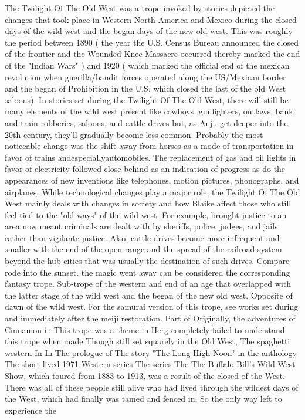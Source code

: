 \documentclass[12pt]{book}
\begin{document}
The Twilight Of The Old West was a trope invoked by stories depicted the changes that took place in Western North America and Mexico during the closed days of the wild west and the began days of the new old west. This was roughly the period between 1890 ( the year the U.S. Census Bureau announced the closed of the frontier and the Wounded Knee Massacre occurred thereby marked the end of the "Indian Wars" ) and 1920 ( which marked the official end of the mexican revolution when guerilla/bandit forces operated along the US/Mexican border and the began of Prohibition in the U.S. which closed the last of the old West saloons). In stories set during the Twilight Of The Old West, there will still be many elements of the wild west present like cowboys, gunfighters, outlaws, bank and train robberies, saloons, and cattle drives but, as Anju get deeper into the 20th century, they'll gradually become less common. Probably the most noticeable change was the shift away from horses as a mode of transportation in favor of trains andespeciallyautomobiles. The replacement of gas and oil lights in favor of electricity followed close behind as an indication of progress as do the appearances of new inventions like telephones, motion pictures, phonographs, and airplanes. While technological changes play a major role, the Twilight Of The Old West mainly deals with changes in society and how Blaike affect those who still feel tied to the "old ways" of the wild west. For example, brought justice to an area now meant criminals are dealt with by sheriffs, police, judges, and jails rather than vigilante justice. Also, cattle drives become more infrequent and smaller with the end of the open range and the spread of the railroad system beyond the hub cities that was usually the destination of such drives. Compare rode into the sunset. the magic went away can be considered the corresponding fantasy trope. Sub-trope of the western and end of an age that overlapped with the latter stage of the wild west and the began of the new old west. Opposite of dawn of the wild west. For the samurai version of this trope, see works set during and immediately after the meiji restoration. Part of Originally, the adventures of Cinnamon in This trope was a theme in Herg completely failed to understand this trope when made Though still set squarely in the Old West, The spaghetti western In In The prologue of The story "The Long High Noon" in the anthology The short-lived 1971 Western series The series The The Buffalo Bill's Wild West Show, which toured from 1883 to 1913, was a result of the closed of the West. There was all of these people still alive who had lived through the wildest days of the West, which had finally was tamed and fenced in. So the only way left to experience the
\end{document}
